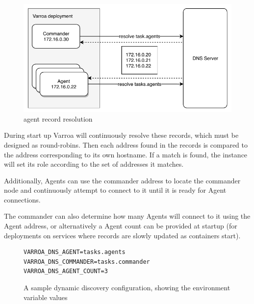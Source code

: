 \begin{figure}[h]
\begin{center}
\includegraphics[scale=0.8]{Resources/PDF/ExecutionDnsDiscovery}
\caption{agent record resolution}
\end{center}
\end{figure}

During start up Varroa will continuously resolve these records, which must be designed as round-robins.
Then each address found in the records is compared to the address corresponding to its own hostname. 
If a match is found, the instance will set its role according to the set of addresses it matches.

Additionally, Agents can use the commander address to locate the commander node and continuously attempt to connect to it until it is ready for Agent connections.

The commander can also determine how many Agents will connect to it using the Agent address, or alternatively a Agent count can be  provided at startup (for deployments on services where records are slowly updated as containers start).

\begin{figure}[h]
\begin{lstlisting}
VARROA_DNS_AGENT=tasks.agents
VARROA_DNS_COMMANDER=tasks.commander
VARROA_DNS_AGENT_COUNT=3
\end{lstlisting}
\caption{A sample dynamic discovery configuration, showing the environment variable values}
\end{figure}
